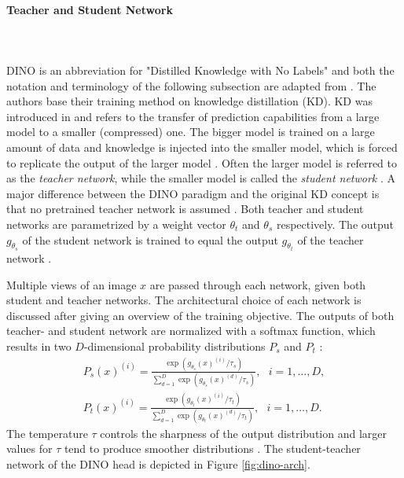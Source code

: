 \paragraph{Teacher and Student Network} \mbox{} \\
\\
DINO is an abbreviation for "Distilled Knowledge with No Labels" and both the notation and terminology of the following subsection are adapted from \citep{Caron2021}.
The authors base their training method on knowledge distillation (KD).
KD was introduced in \citep{Hinton2015} and refers to the transfer of prediction capabilities from a large model to a smaller (compressed) one.
The bigger model is trained on a large amount of data and knowledge is injected into the smaller model, which is forced to replicate the output of the larger model \citep{Hinton2015,Caron2021}.
Often the larger model is referred to as the \textit{teacher network}, while the smaller model is called the \textit{student network} \citep{Caron2021}. 
A major difference between the DINO paradigm and the original KD concept is that no pretrained teacher network is assumed \citep{Caron2021}.
Both teacher and student networks are parametrized by a weight vector $\theta_t$ and $\theta_s$ respectively.
The output $g_{\theta_s}$ of the student network is trained to equal the output $g_{\theta_t}$ of the teacher network \citep{Caron2021}.
\par
Multiple views of an image $x$ are passed through each network, given both student and teacher networks.
The architectural choice of each network is discussed after giving an overview of the training objective.
The outputs of both teacher- and student network are normalized with a softmax function, which results in two $D$-dimensional probability distributions $P_s$ and $P_t$ \citep{Caron2021}:
\begin{align}
	P_{s}(x)^{(i)} = \frac{\exp(g_{\theta_{s}}(x)^{(i)}/\tau_{s})}{\sum_{d=1}^{D}\exp(g_{\theta_{s}}(x)^{(d)}/\tau_{s})}, \hspace{8pt} i=1,\dots,D, \\
	P_{t}(x)^{(i)} = \frac{\exp(g_{\theta_{t}}(x)^{(i)}/\tau_{t})}{\sum_{d=1}^{D}\exp(g_{\theta_{t}}(x)^{(d)}/\tau_{t})}, \hspace{8pt} i=1,\dots,D.
	\label{equation:dino-softmax}
\end{align}
The temperature $\tau$ controls the sharpness of the output distribution \citep{Caron2021} and larger values for $\tau$ tend to produce smoother distributions \citep{Hinton2015}.
The student-teacher network of the DINO head is depicted in Figure \ref{fig:dino-arch}.
